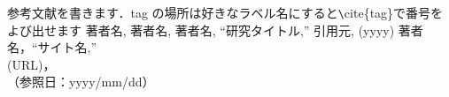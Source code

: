 \begin{thebibliography}{99}
 参考文献を書きます．tag の場所は好きなラベル名にすると\verb|\|cite\{tag\}で番号をよび出せます
 著者名, 著者名, 著者名, ``研究タイトル,'' 引用元, (yyyy)
 著者名，``サイト名,'' \\(URL)，\\（参照日：yyyy/mm/dd）
\end{thebibliography}
